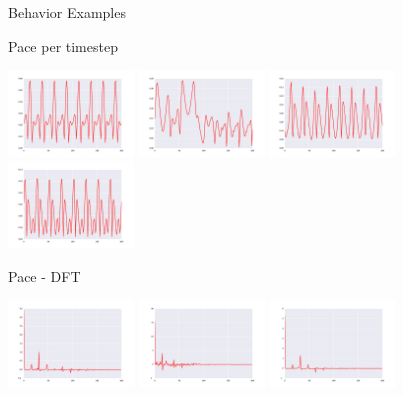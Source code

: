 \documentclass{beamer}
\begin{document}
\begin{frame}[allowframebreaks]{Behavior Examples}
\begin{minipage}{\textwidth}
\begin{block}{Pace per timestep}
\begin{center}
\includegraphics[width=0.25\textwidth]{../Figures/Behaviors/20.pdf}
\includegraphics[width=0.25\textwidth]{../Figures/Behaviors/21.pdf}
\includegraphics[width=0.25\textwidth]{../Figures/Behaviors/22.pdf}
\includegraphics[width=0.25\textwidth]{../Figures/Behaviors/23.pdf}
\end{center}
\end{block}
\begin{block}{Pace - DFT}
\begin{center}
\includegraphics[width=0.25\textwidth]{../Figures/Behaviors/30.pdf}
\includegraphics[width=0.25\textwidth]{../Figures/Behaviors/31.pdf}
\includegraphics[width=0.25\textwidth]{../Figures/Behaviors/32.pdf}

\end{center}
\end{block}
\end{minipage}
\end{frame}
\end{document}
